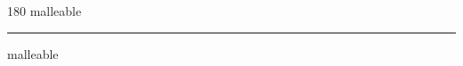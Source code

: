 
\begin{frame}
\begin{center}
\begin{turn}{180}
{\fontsize{2.5cm}{1em}\selectfont malleable}
\end{turn}
\vspace{1em}\par  
\hrule
\vspace{1em}\par  
{\fontsize{2.5cm}{1em}\selectfont malleable}
\end{center}
\end{frame}
